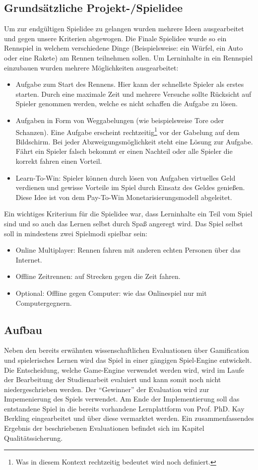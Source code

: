 \subsection{Grundsätzliche Projekt-/Spielidee}
Um zur endgültigen Spielidee zu gelangen wurden mehrere Ideen ausgearbeitet und gegen unsere Kriterien abgewogen.
	Die Finale Spielidee wurde so ein Rennspiel in welchem verschiedene Dinge (Beispielsweise: ein Würfel, ein Auto oder eine Rakete) am Rennen teilnehmen sollen. Um Lerninhalte in ein Rennspiel einzubauen wurden mehrere Möglichkeiten ausgearbeitet:
	\begin{itemize}
		\item{ Aufgabe zum Start des Rennens. Hier kann der schnellste Spieler als erstes starten. Durch eine maximale Zeit und mehrere Versuche sollte Rücksicht auf Spieler genommen werden, welche es nicht schaffen die Aufgabe zu lösen. }
		\item{ Aufgaben in Form von Weggabelungen (wie beispielsweise Tore oder Schanzen). Eine Aufgabe erscheint rechtzeitig\footnote{Was in diesem Kontext rechtzeitig bedeutet wird noch definiert.} vor der Gabelung auf dem Bildschirm. Bei jeder Abzweigungsmöglichkeit steht eine Lösung zur Aufgabe. Fährt ein Spieler falsch  bekommt er einen Nachteil oder alle Spieler die korrekt fahren einen Vorteil. }
		\item{ Learn-To-Win: Spieler können durch lösen von Aufgaben virtuelles Geld verdienen und gewisse Vorteile im Spiel durch Einsatz des Geldes genießen. Diese Idee ist von dem Pay-To-Win Monetarisierungsmodell abgeleitet. }
	\end{itemize}
	Ein wichtiges Kriterium für die Spielidee war, dass Lerninhalte ein Teil vom Spiel sind und so auch das Lernen selbst durch Spaß angeregt wird.
	Das Spiel selbst soll in mindestens zwei Spielmodi spielbar sein:
	\begin{itemize}
		\item{ Online Multiplayer: Rennen fahren mit anderen echten Personen über das Internet. }
		\item{ Offline Zeitrennen: auf Strecken gegen die Zeit fahren. }
		\item{ Optional: Offline gegen Computer: wie das Onlinespiel nur mit Computergegnern. }
	\end{itemize}


\subsection{Aufbau}
Neben den bereits erwähnten wissenschaftlichen Evaluationen über Gamification und spielerisches Lernen wird das Spiel in einer gängigen Spiel-Engine entwickelt.
Die Entscheidung, welche Game-Engine verwendet werden wird, wird im Laufe der Bearbeitung der Studienarbeit evaluiert und kann somit noch nicht niedergeschrieben werden. Der \enquote{Gewinner} der Evaluation wird zur Impemenierung des Spiels verwendet.
Am Ende der Implementierung soll das entstandene Spiel in die bereits vorhandene Lernplattform von Prof. PhD. Kay Berkling eingearbeitet und über diese vermarktet werden.
Ein zusammenfassendes Ergebnis der beschriebenen Evaluationen befindet sich im Kapitel Qualitätssicherung.

